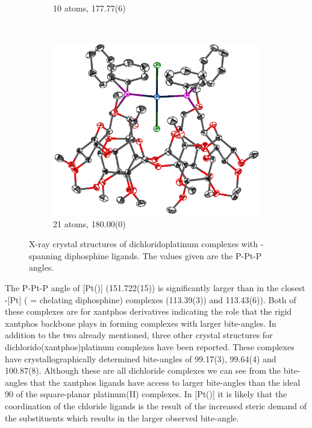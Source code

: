 \begin{figure}[htbp]
\begin{subfigure}[b]{0.32\textwidth}
                \caption{10 atoms, 177.77(6)\degrees}
                \label{WIBCIU}
        \end{subfigure}
        ~
        \begin{subfigure}[b]{0.32\textwidth}
                \includegraphics[width=\textwidth]{../Othercrystals/PtCl2/Trans/202109.eps}
                \caption{21 atoms, 180.00(0)\degrees}
                \label{OJUBAW}
        \end{subfigure}
        \caption[X-ray crystal structures of dichloridoplatinum complexes with \trans-spanning diphosphine ligands]{X-ray crystal structures of dichloridoplatinum complexes with \trans-spanning diphosphine ligands.  The values given are the P-Pt-P angles.}
        \label{crystal:transspanning}
        \end{figure}

The P-Pt-P angle of [Pt(\tButhixantphos)] (151.722(15)\degrees) is significantly larger than in the closest \cis{}-[Pt] ( = chelating diphosphine) complexes (113.39(3))\degrees{} and 113.43(6)\degrees{}).  Both of these complexes are for xantphos derivatives indicating the role that the rigid xantphos backbone plays in forming complexes with larger bite-angles.\cite{Vlugt2003, Mora2008}  In addition to the two already mentioned, three other crystal structures for dichlorido(xantphos)platinum complexes have been reported.\cite{Duren2006, Duren2007, Niksch2010}  These complexes have crystallographically determined bite-angles of 99.17(3), 99.64(4) and 100.87(8)\degrees.  Although these are all \cis{} dichloride complexes we can see from the bite-angles that the xantphos ligands have access to larger bite-angles than the ideal 90\degrees{} of the square-planar platinum(II) complexes.  In [Pt(\tButhixantphos)] it is likely that the \trans{} coordination of the chloride ligands is the result of the increased steric demand of the \tBu{} substituents which results in the larger observed bite-angle.  


